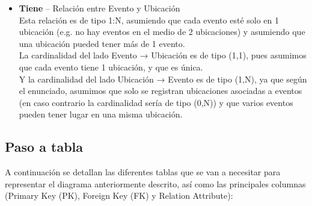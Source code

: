 \documentclass[12pt]{article}
\begin{document}
\begin{itemize}
        \item \textbf{Tiene} -- Relación entre Evento y Ubicación\\
            Esta relación es de tipo 1:N, asumiendo que cada evento esté solo en 1 ubicación (e.g. no hay eventos en el medio de 2 ubicaciones)
            y asumiendo que una ubicación pueded tener más de 1 evento. \\
            La cardinalidad del lado Evento → Ubicación es de tipo (1,1), pues asumimos que cada evento tiene 1 ubicación, y que es única. \\
            Y la cardinalidad del lado Ubicación → Evento es de tipo (1,N), ya que según el enunciado, asumimos que solo se registran ubicaciones asociadas 
            a eventos (en caso contrario la cardinalidad sería de tipo (0,N)) y que varios eventos pueden tener lugar en una misma ubicación.

    \end{itemize}

    \newpage
    \subsection{Paso a tabla}
    A continuación se detallan las diferentes tablas que se van a necesitar para representar el diagrama anteriormente descrito, así como las principales columnas 
    (Primary Key (PK), Foreign Key (FK) y Relation Attribute):
\end{document}
